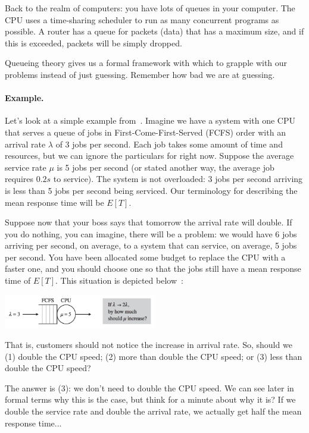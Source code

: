 Back to the realm of computers: you have lots of queues in your computer. The CPU uses a time-sharing scheduler to run as many concurrent programs as possible. A router has a queue for packets (data) that has a maximum size, and if this is exceeded, packets will be simply dropped. 

Queueing theory gives us a formal framework with which to grapple with our problems instead of just guessing. Remember how bad we are at guessing. 


\paragraph{Example.} Let's look at a simple example from~\cite{pmd}. Imagine we have a system with one CPU that serves a queue of jobs in First-Come-First-Served (FCFS) order with an arrival rate $\lambda$ of 3 jobs per second. Each job takes some amount of time and resources, but we can ignore the particulars for right now. Suppose the average service rate $\mu$ is 5 jobs per second (or stated another way, the average job requires $0.2s$ to service). The system is not overloaded: 3 jobs per second arriving is less than 5 jobs per second being serviced. Our terminology for describing the mean response time will be $E[T]$. 


Suppose now that your boss says that tomorrow the arrival rate will double. If you do nothing, you can imagine, there will be a problem: we would have 6 jobs arriving per second, on average, to a system that can service, on average, 5 jobs per second. You have been allocated some budget to replace the CPU with a faster one, and you should choose one so that the jobs still have a mean response time of $E[T]$. This situation is depicted below~\cite{pmd}:


\begin{center}
	\includegraphics[width=0.5\textwidth]{images/qt-example1.png}
\end{center}

That is, customers should not notice the increase in arrival rate. So, should we (1) double the CPU speed; (2) more than double the CPU speed; or (3) less than double the CPU speed?

The answer is (3): we don't need to double the CPU speed. We can see later in formal terms why this is the case, but think for a minute about why it is? If we double the service rate and double the arrival rate, we actually get half the mean response time...

